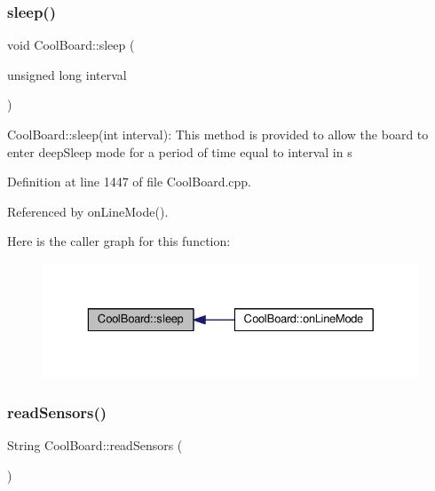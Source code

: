 \mbox{\label{class_cool_board_a069952cdcb2e7f68518aa429eceadb6e}} 
\subsubsection{\texorpdfstring{sleep()}{sleep()}}
{\footnotesize\ttfamily void Cool\+Board\+::sleep (\begin{DoxyParamCaption}\item[{unsigned long}]{interval }\end{DoxyParamCaption})}

Cool\+Board\+::sleep(int interval)\+: This method is provided to allow the board to enter deep\+Sleep mode for a period of time equal to interval in s 

Definition at line 1447 of file Cool\+Board.\+cpp.



Referenced by on\+Line\+Mode().

Here is the caller graph for this function\+:\nopagebreak
\begin{figure}[H]
\begin{center}
\leavevmode
\includegraphics[width=329pt]{d7/df9/class_cool_board_a069952cdcb2e7f68518aa429eceadb6e_icgraph}
\end{center}
\end{figure}
\mbox{\label{class_cool_board_ad03abdce2e65f520bbf2cff0f2d083cf}} 
\subsubsection{\texorpdfstring{read\+Sensors()}{readSensors()}}
{\footnotesize\ttfamily String Cool\+Board\+::read\+Sensors (\begin{DoxyParamCaption}{ }\end{DoxyParamCaption})}

